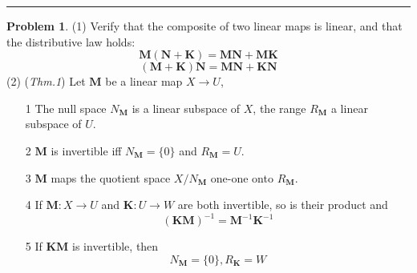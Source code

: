\documentclass[a4paper, 10pt]{article}
\theoremstyle{definition}
\newtheorem{problem}{Problem}
\theoremstyle{hSol}
\begin{document}
\noindent\rule{16cm}{0.4pt}
\begin{problem} (1) Verify that the composite of two linear maps is linear, and that the distributive law holds:
$$\bm{M}(\bm{N}+\bm{K})=\bm{MN}+\bm{MK}$$
$$(\bm{M+K})\bm{N}=\bm{MN}+\bm{KN}$$
(2) (\textit{Thm.1}) Let $\bm{M}$ be a linear map $X \to U$, 
\begin{itemize}
	\item[1] The null space $N_{\bm{M}}$ is a linear subspace of $X$, the range $R_{\bm{M}}$ a linear subspace of $U$.
	\item[2] $\bm{M}$ is invertible iff $N_{\bm{M}}=\{0\}$ and $R_{\bm{M}}=U$.
	\item[3] $\bm{M}$ maps the quotient space $X/N_{\bm{M}}$ one-one onto $R_{\bm{M}}$.
	\item[4] If $\bm{M}: X\to U$ and $\bm{K}: U \to W$ are both invertible, so is their product and
	$$(\bm{KM})^{-1} = \bm{M}^{-1} \bm{K}^{-1}$$
	\item[5] If $\bm{KM}$ is invertible, then
	$$N_{\bm{M}}=\{0\}, R_{\bm{K}}=W$$
\end{itemize}
\end{problem}
\end{document}
